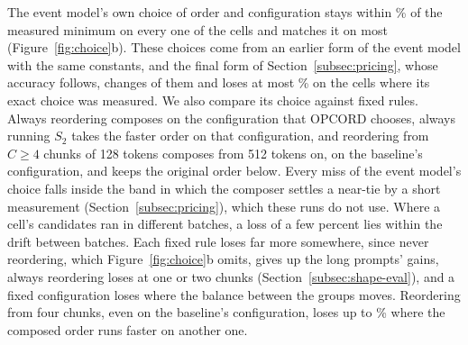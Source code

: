 The event model's own choice of order and configuration stays within \ChoiceOpcordMax\% of the measured minimum on every one of the \ChoiceCells{} cells and matches it on most (Figure~\ref{fig:choice}b).
These choices come from an earlier form of the event model with the same constants, and the final form of Section~\ref{subsec:pricing}, whose accuracy follows, changes \FinalChanged{} of them and loses at most \FinalLossMax\% on the \FinalMeasured{} cells where its exact choice was measured.
We also compare its choice against fixed rules.
Always reordering composes on the configuration that OPCORD chooses, always running $S_2$ takes the faster order on that configuration, and reordering from $C \ge 4$ chunks of 128 tokens composes from 512 tokens on, on the baseline's configuration, and keeps the original order below.
Every miss of the event model's choice falls inside the band in which the composer settles a near-tie by a short measurement (Section~\ref{subsec:pricing}), which these runs do not use.
Where a cell's candidates ran in different batches, a loss of a few percent lies within the drift between batches.
Each fixed rule loses far more somewhere, since never reordering, which Figure~\ref{fig:choice}b omits, gives up the long prompts' gains, always reordering loses at one or two chunks (Section~\ref{subsec:shape-eval}), and a fixed configuration loses where the balance between the groups moves.
Reordering from four chunks, even on the baseline's configuration, loses up to \ChoiceFourBaseMax\% where the composed order runs faster on another one.
